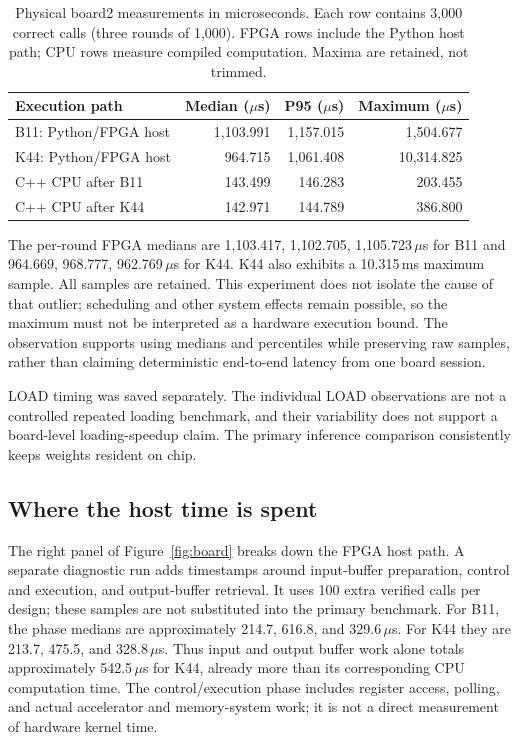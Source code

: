 \documentclass[11pt,letterpaper]{article}
\begin{document}
\begin{table}[tb]
\centering
\small
\caption{Physical board2 measurements in microseconds. Each row contains 3,000
correct calls (three rounds of 1,000). FPGA rows include the Python host path;
CPU rows measure compiled computation. Maxima are retained, not trimmed.}
\label{tab:board}
\begin{tabular}{lrrr}
\toprule
Execution path & Median ($\mu$s) & P95 ($\mu$s) & Maximum ($\mu$s)\\
\midrule
B11: Python/FPGA host & 1,103.991 & 1,157.015 & 1,504.677 \\
K44: Python/FPGA host & 964.715 & 1,061.408 & 10,314.825 \\
C++ CPU after B11 & 143.499 & 146.283 & 203.455 \\
C++ CPU after K44 & 142.971 & 144.789 & 386.800 \\
\bottomrule
\end{tabular}
\end{table}

The per-round FPGA medians are 1,103.417, 1,102.705, 1,105.723\,$\mu$s for B11 and
964.669, 968.777, 962.769\,$\mu$s for K44. K44 also exhibits a 10.315\,ms maximum sample.
All samples are retained. This experiment does not isolate the cause of that
outlier; scheduling and other system effects remain possible, so the maximum
must not be interpreted as a hardware execution bound. The observation supports
using medians and percentiles while preserving raw samples, rather than claiming
deterministic end-to-end latency from one board session.

LOAD timing was saved separately. The individual LOAD observations are not a
controlled repeated loading benchmark, and their variability does not support a
board-level loading-speedup claim. The primary inference comparison consistently
keeps weights resident on chip.

\subsection{Where the host time is spent}
The right panel of Figure~\ref{fig:board} breaks down the FPGA host path.
A separate diagnostic run adds timestamps around input-buffer preparation,
control and execution, and output-buffer retrieval. It uses 100 extra verified
calls per design; these samples are not substituted into the primary benchmark.
For B11, the phase medians are approximately 214.7, 616.8, and
329.6\,$\mu$s. For K44 they are 213.7, 475.5, and 328.8\,$\mu$s.
Thus input and output buffer work alone totals approximately 542.5\,$\mu$s
for K44, already more than its corresponding CPU computation time. The
control/execution phase includes register access, polling, and actual accelerator
and memory-system work; it is not a direct measurement of hardware kernel time.
\end{document}
